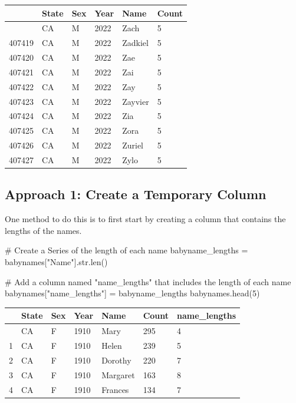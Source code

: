 \documentclass[
  letterpaper,
  DIV=11,
  numbers=noendperiod]{scrreprt}
\newenvironment{Shaded}{\begin{snugshade}}{\end{snugshade}}
\newcommand{\BuiltInTok}[1]{\textcolor[rgb]{0.00,0.23,0.31}{#1}}
\newcommand{\CommentTok}[1]{\textcolor[rgb]{0.37,0.37,0.37}{#1}}
\newcommand{\DecValTok}[1]{\textcolor[rgb]{0.68,0.00,0.00}{#1}}
\newcommand{\NormalTok}[1]{\textcolor[rgb]{0.00,0.23,0.31}{#1}}
\newcommand{\OperatorTok}[1]{\textcolor[rgb]{0.37,0.37,0.37}{#1}}
\newcommand{\StringTok}[1]{\textcolor[rgb]{0.13,0.47,0.30}{#1}}
\begin{document}
\begin{longtable}[]{@{}llllll@{}}
\toprule\noalign{}
& State & Sex & Year & Name & Count \\
\midrule\noalign{}
\endhead
\bottomrule\noalign{}
\endlastfoot
407418 & CA & M & 2022 & Zach & 5 \\
407419 & CA & M & 2022 & Zadkiel & 5 \\
407420 & CA & M & 2022 & Zae & 5 \\
407421 & CA & M & 2022 & Zai & 5 \\
407422 & CA & M & 2022 & Zay & 5 \\
407423 & CA & M & 2022 & Zayvier & 5 \\
407424 & CA & M & 2022 & Zia & 5 \\
407425 & CA & M & 2022 & Zora & 5 \\
407426 & CA & M & 2022 & Zuriel & 5 \\
407427 & CA & M & 2022 & Zylo & 5 \\
\end{longtable}

\subsection{Approach 1: Create a Temporary
Column}\label{approach-1-create-a-temporary-column}

One method to do this is to first start by creating a column that
contains the lengths of the names.

\begin{Shaded}
\begin{Highlighting}[]
\CommentTok{\# Create a Series of the length of each name}
\NormalTok{babyname\_lengths }\OperatorTok{=}\NormalTok{ babynames[}\StringTok{"Name"}\NormalTok{].}\BuiltInTok{str}\NormalTok{.}\BuiltInTok{len}\NormalTok{()}

\CommentTok{\# Add a column named "name\_lengths" that includes the length of each name}
\NormalTok{babynames[}\StringTok{"name\_lengths"}\NormalTok{] }\OperatorTok{=}\NormalTok{ babyname\_lengths}
\NormalTok{babynames.head(}\DecValTok{5}\NormalTok{)}
\end{Highlighting}
\end{Shaded}

\begin{longtable}[]{@{}lllllll@{}}
\toprule\noalign{}
& State & Sex & Year & Name & Count & name\_lengths \\
\midrule\noalign{}
\endhead
\bottomrule\noalign{}
\endlastfoot
0 & CA & F & 1910 & Mary & 295 & 4 \\
1 & CA & F & 1910 & Helen & 239 & 5 \\
2 & CA & F & 1910 & Dorothy & 220 & 7 \\
3 & CA & F & 1910 & Margaret & 163 & 8 \\
4 & CA & F & 1910 & Frances & 134 & 7 \\
\end{longtable}
\end{document}

